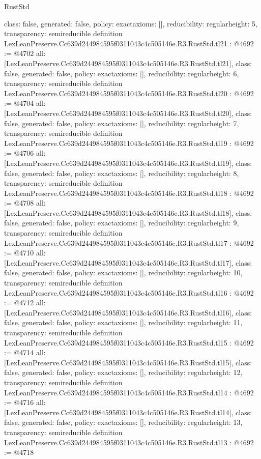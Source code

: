 \begin{lexlean}{RustStd}
\begin{coremodule}
{  class: false,
  generated: false,
  policy: exact{axioms: []},
  reducibility: regular{height: 5},
  transparency: semireducible
}
definition LexLeanPreserve.Cc639d244984595f0311043c4c505146e.R3.RustStd.tl21 : @4692 := @4702 {
  all: [LexLeanPreserve.Cc639d244984595f0311043c4c505146e.R3.RustStd.tl21],
  class: false,
  generated: false,
  policy: exact{axioms: []},
  reducibility: regular{height: 6},
  transparency: semireducible
}
definition LexLeanPreserve.Cc639d244984595f0311043c4c505146e.R3.RustStd.tl20 : @4692 := @4704 {
  all: [LexLeanPreserve.Cc639d244984595f0311043c4c505146e.R3.RustStd.tl20],
  class: false,
  generated: false,
  policy: exact{axioms: []},
  reducibility: regular{height: 7},
  transparency: semireducible
}
definition LexLeanPreserve.Cc639d244984595f0311043c4c505146e.R3.RustStd.tl19 : @4692 := @4706 {
  all: [LexLeanPreserve.Cc639d244984595f0311043c4c505146e.R3.RustStd.tl19],
  class: false,
  generated: false,
  policy: exact{axioms: []},
  reducibility: regular{height: 8},
  transparency: semireducible
}
definition LexLeanPreserve.Cc639d244984595f0311043c4c505146e.R3.RustStd.tl18 : @4692 := @4708 {
  all: [LexLeanPreserve.Cc639d244984595f0311043c4c505146e.R3.RustStd.tl18],
  class: false,
  generated: false,
  policy: exact{axioms: []},
  reducibility: regular{height: 9},
  transparency: semireducible
}
definition LexLeanPreserve.Cc639d244984595f0311043c4c505146e.R3.RustStd.tl17 : @4692 := @4710 {
  all: [LexLeanPreserve.Cc639d244984595f0311043c4c505146e.R3.RustStd.tl17],
  class: false,
  generated: false,
  policy: exact{axioms: []},
  reducibility: regular{height: 10},
  transparency: semireducible
}
definition LexLeanPreserve.Cc639d244984595f0311043c4c505146e.R3.RustStd.tl16 : @4692 := @4712 {
  all: [LexLeanPreserve.Cc639d244984595f0311043c4c505146e.R3.RustStd.tl16],
  class: false,
  generated: false,
  policy: exact{axioms: []},
  reducibility: regular{height: 11},
  transparency: semireducible
}
definition LexLeanPreserve.Cc639d244984595f0311043c4c505146e.R3.RustStd.tl15 : @4692 := @4714 {
  all: [LexLeanPreserve.Cc639d244984595f0311043c4c505146e.R3.RustStd.tl15],
  class: false,
  generated: false,
  policy: exact{axioms: []},
  reducibility: regular{height: 12},
  transparency: semireducible
}
definition LexLeanPreserve.Cc639d244984595f0311043c4c505146e.R3.RustStd.tl14 : @4692 := @4716 {
  all: [LexLeanPreserve.Cc639d244984595f0311043c4c505146e.R3.RustStd.tl14],
  class: false,
  generated: false,
  policy: exact{axioms: []},
  reducibility: regular{height: 13},
  transparency: semireducible
}
definition LexLeanPreserve.Cc639d244984595f0311043c4c505146e.R3.RustStd.tl13 : @4692 := @4718 {
}
\end{coremodule}
\end{lexlean}
